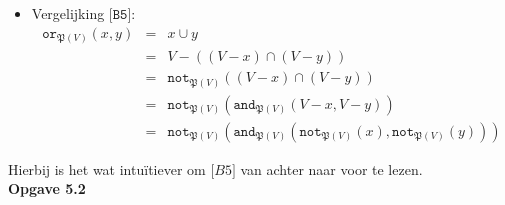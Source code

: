 \documentclass[a4paper,11pt]{article}
\begin{document}
\begin{itemize}
\item{Vergelijking $\texttt{[B5]}$:}
\begin{eqnarray*}
\texttt{or}_{\mathfrak{P}(V)}(x,y) & = & x \cup y \\
                                   & = & V - ((V - x) \cap (V - y)) \\
                                   & = & \texttt{not}_{\mathfrak{P}(V)}((V - x) \cap (V - y)) \\
                                   & = & \texttt{not}_{\mathfrak{P}(V)}(\texttt{and}_{\mathfrak{P}(V)}(V - x, V - y)) \\
                                   & = & \texttt{not}_{\mathfrak{P}(V)}(\texttt{and}_{\mathfrak{P}(V)}(\texttt{not}_{\mathfrak{P}(V)}(x),\texttt{not}_{\mathfrak{P}(V)}(y)))
\end{eqnarray*}

\end{itemize}

Hierbij is het wat intu\"itiever om $\texttt[B5]$ van achter naar voor te lezen.\\[2em]


{\bf Opgave 5.2}
\end{document}
